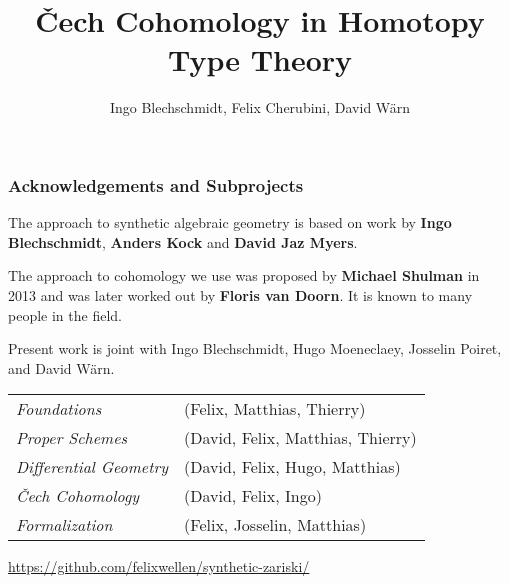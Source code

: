 \documentclass{beamer}
\title[ConCoh]
{\v{C}ech Cohomology in Homotopy Type Theory}
\author[Author, Anders] 
{Ingo Blechschmidt, Felix Cherubini, David Wärn}
\begin{document}
\date{}
\begin{frame}
  \titlepage
\end{frame}

\begin{frame}
  \frametitle{Acknowledgements and Subprojects}
  The approach to synthetic algebraic geometry is based on work by  \textbf{Ingo Blechschmidt}, \textbf{Anders Kock} and \textbf{David Jaz Myers}.

  \pause
  \vspace{0.25cm}
  The approach to cohomology we use was proposed by \textbf{Michael Shulman} in 2013 and was later worked out by \textbf{Floris van Doorn}.
  It is known to many people in the field.

  \pause
  \vspace{0.5cm}
  Present work is joint with
  Ingo Blechschmidt,
  Hugo Moeneclaey,
  Josselin Poiret, and
  David Wärn.

  \vspace{0.25cm}
  \begin{tabular}{lp{7.5cm}}
    \textit{Foundations} & (Felix, Matthias, Thierry) \\
    \textit{Proper Schemes} & (David, Felix, Matthias, Thierry) \\
    \textit{Differential Geometry} & (David, Felix, Hugo, Matthias) \\
    \textit{\v{C}ech Cohomology} & (David, Felix, Ingo) \\
    \textit{Formalization} & (Felix, Josselin, Matthias) \\
  \end{tabular}

  \vspace{0.25cm}
  \url{https://github.com/felixwellen/synthetic-zariski/}
\end{frame}
\end{document}
